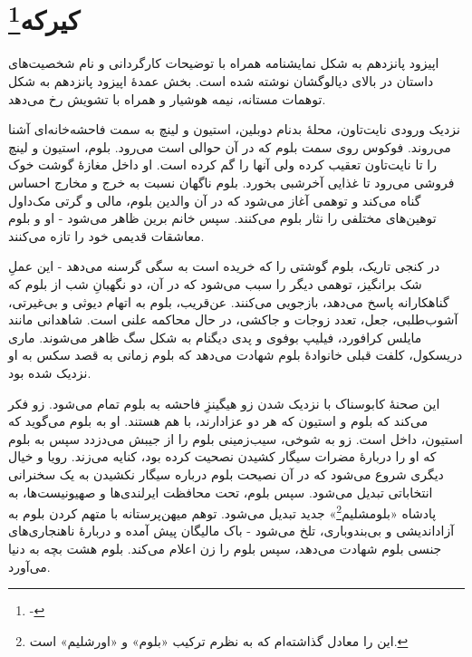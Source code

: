 \documentclass[12pt]{book}
\begin{document}
    \chapter[کیرکه]{کیرکه\protect\footnote{-}}\label{ep:15}
    اپیزود پانزدهم به شکل نمایشنامه همراه با توضیحات کارگردانی و نام شخصیت‌های داستان در بالای دیالوگشان نوشته شده است. بخش عمدۀ اپیزود پانزدهم به شکل توهمات مستانه، نیمه هوشیار و همراه با تشویش رخ می‌دهد.

    نزدیک ورودی نایت‌تاون، محلۀ بدنام دوبلین، استیون و لینچ به سمت فاحشه‌خانه‌ای آشنا می‌روند. فوکوس روی سمت بلوم که در آن حوالی است می‌رود. بلوم، استیون و لینچ را تا نایت‌تاون تعقیب کرده ولی آنها را گم کرده است. او داخل مغازۀ گوشت خوک فروشی می‌رود تا غذایی آخرشبی بخورد. بلوم ناگهان نسبت به خرج و مخارج احساس گناه می‌کند و توهمی آغاز می‌شود که در آن والدین بلوم، مالی و گرتی مک‌داول توهین‌های مختلفی را نثار بلوم می‌کنند. سپس خانم برین ظاهر می‌شود - او و بلوم معاشقات قدیمی خود را تازه می‌کنند.

    در کنجی تاریک، بلوم گوشتی را که خریده است به سگی گرسنه می‌دهد - این عملِ شک برانگیز، توهمی دیگر را سبب می‌شود که در آن، دو نگهبانِ شب از بلوم که گناهکارانه پاسخ می‌دهد، بازجویی می‌کنند. عن‌قریب، بلوم به اتهام دیوثی و بی‌غیرتی، آشوب‌طلبی، جعل، تعدد زوجات و جاکشی، در حال محاکمه علنی است. شاهدانی مانند مایلس کرافورد، فیلیپ بوفوی و پدی دیگنام به شکل سگ ظاهر می‌شوند. ماری دریسکول، کلفت قبلی خانوادۀ بلوم شهادت می‌دهد که بلوم زمانی به قصد سکس به او نزدیک شده بود.

    این صحنۀ کابوسناک با نزدیک شدن زو هیگینزِ فاحشه به بلوم تمام می‌شود. زو فکر می‌کند که بلوم و استیون که هر دو عزادارند، با هم هستند. او به بلوم می‌گوید که استیون، داخل است. زو به شوخی، سیب‌زمینی بلوم را از جیبش می‌دزدد سپس به بلوم که او را دربارۀ مضرات سیگار کشیدن نصحیت کرده بود، کنایه می‌زند. رویا و خیال دیگری شروع می‌شود که در آن نصیحت بلوم درباره سیگار نکشیدن به یک سخنرانی انتخاباتی تبدیل می‌شود. سپس بلوم، تحت محافظت ایرلندی‌ها و صهیونیست‌ها، به پادشاه «بلومشلیم\footnote{این را معادل  گذاشته‌ام که به نظرم ترکیب «بلوم»  و «اورشلیم»  است.}» جدید تبدیل می‌شود. توهم میهن‌پرستانه با متهم کردن بلوم به آزاداندیشی و بی‌بندوباری، تلخ می‌شود - باک مالیگان پیش آمده و دربارۀ ناهنجاری‌های جنسی بلوم شهادت می‌دهد، سپس بلوم را زن اعلام می‌کند. بلوم هشت بچه به دنیا می‌آورد.
\end{document}

